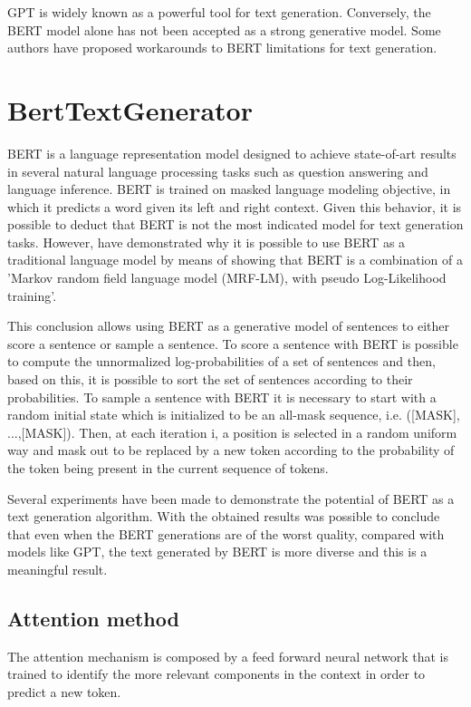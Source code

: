 \documentclass[10pt,twocolumn,letterpaper]{article}
\begin{document}
GPT is widely known as a powerful tool for text generation.
Conversely, the BERT model alone has not been accepted as a strong generative model.
Some authors \cite{wang2019bert} have proposed workarounds to BERT limitations for text generation.

\section{BertTextGenerator}
BERT is a language representation model designed to achieve state-of-art results
in several natural language processing tasks such as question answering and language inference.
BERT is trained on masked language modeling objective, in which it predicts a word given its
left and right context.
Given this behavior, it is possible to deduct that BERT is not the most
indicated model for text generation tasks.
However, \cite{wang2019bert} have demonstrated why it is possible to use BERT as a traditional
language model by means of showing that BERT is a combination of a 'Markov random field
language model (MRF-LM), with pseudo Log-Likelihood training'.

This conclusion allows using BERT as a generative model of sentences to either score a sentence or
sample a sentence.
To score a sentence with BERT is possible to compute the unnormalized log-probabilities of a set of
sentences and then, based on this, it is possible to sort the set of sentences according to their probabilities.
To sample a sentence with BERT it is necessary to start with a random initial state which is initialized to be
an all-mask sequence, i.e. ([MASK], ...,[MASK]).
Then, at each iteration i, a position is selected in a random uniform way and mask out to be replaced
by a new token according to the probability of the token being present in the current sequence of tokens.

Several experiments have been made to demonstrate the potential of BERT as a text generation algorithm.
With the obtained results was possible to conclude that even when the BERT generations are of the worst quality,
compared with models like GPT, the text generated by BERT is more diverse and this is a meaningful result.

\subsection{Attention method}
The attention mechanism is composed by a feed forward neural network that is trained to
identify the more relevant components in the context in order to predict a new token.
\end{document}
